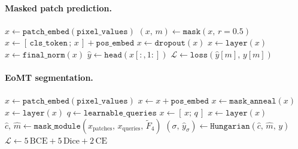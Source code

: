 \paragraph{Masked patch prediction.}
\begin{algorithmic}[1]
\State $x \gets \texttt{patch\_embed}(\texttt{pixel\_values})$ 
\State $(x,\, m) \gets \texttt{mask}(x,\, r=0.5)$ 
\State $x \gets [\,\texttt{cls\_token}\,;\, x\,] + \texttt{pos\_embed}$
\State $x \gets \texttt{dropout}(x)$
    \State $x \gets \texttt{layer}(x)$
\EndFor
\State $x \gets \texttt{final\_norm}(x)$
\State $\hat{y} \gets \texttt{head}(x[:, 1:])$ 
\State $\mathcal{L} \gets \texttt{loss}(\hat{y}[m],\, y[m])$ 
\end{algorithmic}

\paragraph{EoMT segmentation.}
\begin{algorithmic}[1]
\State $x \gets \texttt{patch\_embed}(\texttt{pixel\_values})$ 
\State $x \gets x + \texttt{pos\_embed}$
\State $x \gets \texttt{mask\_anneal}(x)$ 
    \State $x \gets \texttt{layer}(x)$ 
\EndFor
\State $q \gets \texttt{learnable\_queries}$ 
\State $x \gets [\,x;\, q\,]$ 
    \State $x \gets \texttt{layer}(x)$ 
\EndFor
\State $\hat{c},\, \hat{m} \gets \texttt{mask\_module}(x_\text{patches},\, x_\text{queries},\, \tilde{F}_4)$ 
\State $(\sigma,\, \hat{y}_\sigma) \gets \texttt{Hungarian}(\hat{c},\, \hat{m},\, y)$ 
\State $\mathcal{L} \gets 5\,\mathrm{BCE} + 5\,\mathrm{Dice} + 2\,\mathrm{CE}$ 
\end{algorithmic}